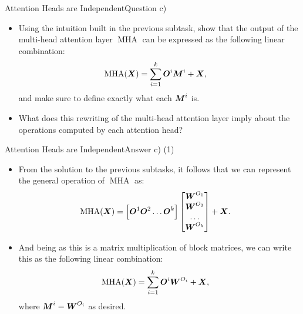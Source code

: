 \documentclass[t]{beamer}
\newcommand\op[1]{\operatorname{#1}}
\begin{document}
\begin{frame}{Attention Heads are Independent}{Question c)}
    \begin{itemize}
        \item Using the intuition built in the previous subtask, show that the
              output of the multi-head attention layer $\op{MHA}$ can be
              expressed as the following linear combination:
              \begin{align}
                  \op{MHA}(\mX) & = \sum_{i=1}^{k} \mO^i\mM^i + \mX,
              \end{align}
              and make sure to define exactly what each ${\boldsymbol{M}}^i$ is.
        \item What does this rewriting of the multi-head attention layer imply
              about the operations computed by each attention head?
    \end{itemize}
\end{frame}

\begin{frame}{Attention Heads are Independent}{Answer c) (1)}
    \begin{itemize}
        \item From the solution to the previous subtasks, it follows that we can
              represent the general operation of $\op{MHA}$ as:
              \begin{align}
                  \op{MHA}(\mX) & = \left[\mO^1\mO^2\ldots\mO^k\right] \begin{bmatrix}
                                                                           \mW^{O_1} \\
                                                                           \mW^{O_2} \\
                                                                           \ldots    \\
                                                                           \mW^{O_k}
                                                                       \end{bmatrix}
                  + \mX.
              \end{align}
        \item And being as this is a matrix multiplication of block matrices, we
              can write this as the following linear combination:
              \begin{align}
                  \op{MHA}(\mX) & = \sum_{i=1}^{k} \mO^i\mW^{O_i} + \mX,
              \end{align}
              where ${\boldsymbol{M}}^i = {\boldsymbol{W}}^{O_i}$ as desired.
    \end{itemize}
\end{frame}
\end{document}
